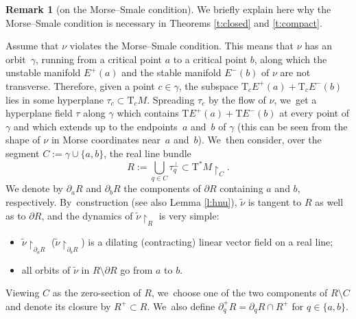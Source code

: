 \documentclass[JEP,XML,SOM,Unicode]{cedram}
\newcommand{\sT}{\mathrm{T}^\ast}
\newcommand{\rT}{\mathrm{T}}
\newcommand{\hnu}{\tilde\nu}
\newcommand{\de}{\mathrel{:=}}
\newcommand{\rst}[1]{{\upharpoonright}_{\!#1}}
\let\del\partial
\theoremstyle{plain}
\theoremstyle{definition}
\newtheorem{remark}[theorem]{Remark}
\begin{document}
\begin{remark}[on the Morse--Smale condition] \label{r:MS}
We briefly explain here why the Morse--Smale condition is necessary in Theorems
\ref{t:closed} and \ref{t:compact}.

Assume that $\nu$ violates the Morse--Smale condition. This means that $\nu$ has
an orbit~$\gamma$, running from a critical point $a$ to a critical point $b$,
along which the unstable manifold $E^+(a)$ and the stable manifold $E^-(b)$ of
$\nu$ are not transverse. Therefore, given a point $c \in \gamma$, the subspace
$\rT_cE^+(a) + \rT_cE^-(b)$ lies in some hyperplane \hbox{$\tau_c \subset \rT_cM$}.
Spreading $\tau_c$ by the flow of $\nu$, we~get a hyperplane field $\tau$ along
$\gamma$ which contains $\rT E^+(a) + \rT E^-(b)$ at every point of $\gamma$ and
which extends up to the endpoints~$a$ and~$b$ of $\gamma$ (this can be seen from
the shape of $\nu$ in Morse coordinates near~$a$ and~$b$). We~then consider,
over the segment $C \de \gamma \cup \{a,b\}$, the real line bundle
\[
R \de \bigcup_{q \in C} \tau_q^\bot \subset \sT M \rst C.
\]
We denote by $\del_aR$ and $\del_bR$ the components of $\del R$ containing $a$
and $b$, respectively. By~construction (see also Lemma \ref{l:hnu}), $\hnu$ is
tangent to $R$ as well as to $\del R$, and the dynamics of $\hnu \rst R$ is very
simple:
\begin{itemize}
\item
$\hnu \rst{ \del_aR }$ (\resp $\hnu \rst{ \del_bR }$) is a dilating (\resp contracting) linear vector field on a real line;
\item
all orbits of $\hnu$ in $R \setminus \del R$ go from $a$ to $b$.
\end{itemize}
Viewing $C$ as the zero-section of $R$, we~choose one of the two components of
$R \setminus C$ and denote its closure by $R^+ \subset R$. We~also define $\del_q^+R =
\del_qR \cap R^+$ for $q \in \{a,b\}$.


\end{remark}
\end{document}
